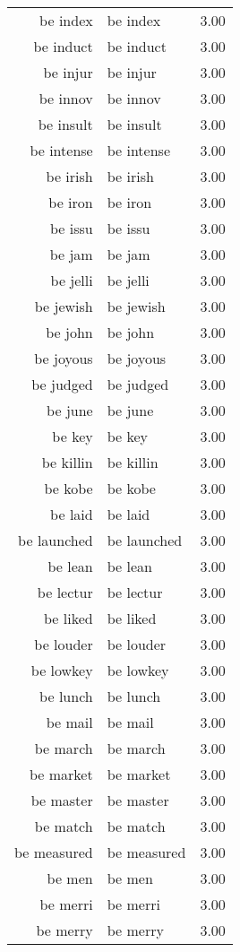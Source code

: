 \begin{table}[ht]
\begin{tabular}{rlr}
  be index & be index & 3.00 \\ 
  be induct & be induct & 3.00 \\ 
  be injur & be injur & 3.00 \\ 
  be innov & be innov & 3.00 \\ 
  be insult & be insult & 3.00 \\ 
  be intense & be intense & 3.00 \\ 
  be irish & be irish & 3.00 \\ 
  be iron & be iron & 3.00 \\ 
  be issu & be issu & 3.00 \\ 
  be jam & be jam & 3.00 \\ 
  be jelli & be jelli & 3.00 \\ 
  be jewish & be jewish & 3.00 \\ 
  be john & be john & 3.00 \\ 
  be joyous & be joyous & 3.00 \\ 
  be judged & be judged & 3.00 \\ 
  be june & be june & 3.00 \\ 
  be key & be key & 3.00 \\ 
  be killin & be killin & 3.00 \\ 
  be kobe & be kobe & 3.00 \\ 
  be laid & be laid & 3.00 \\ 
  be launched & be launched & 3.00 \\ 
  be lean & be lean & 3.00 \\ 
  be lectur & be lectur & 3.00 \\ 
  be liked & be liked & 3.00 \\ 
  be louder & be louder & 3.00 \\ 
  be lowkey & be lowkey & 3.00 \\ 
  be lunch & be lunch & 3.00 \\ 
  be mail & be mail & 3.00 \\ 
  be march & be march & 3.00 \\ 
  be market & be market & 3.00 \\ 
  be master & be master & 3.00 \\ 
  be match & be match & 3.00 \\ 
  be measured & be measured & 3.00 \\ 
  be men & be men & 3.00 \\ 
  be merri & be merri & 3.00 \\ 
  be merry & be merry & 3.00 \\ 

\end{tabular}
\end{table}
